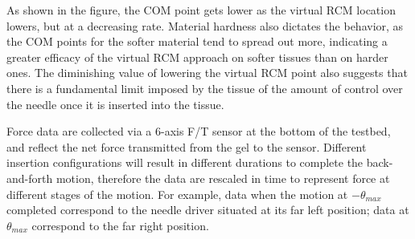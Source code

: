 \begin{table}[h]
\centering
\caption{Experimentally determined COM locations, $E_{com}$, and simulated COM locations, $S_{com}$, for the two gel materials.}
\label{tab:COM_pos_table}
\end{table}

As shown in the figure, the COM point gets lower as the virtual RCM location lowers, but at a decreasing rate. Material hardness also dictates the behavior, as the COM points for the softer material tend to spread out more, indicating a greater efficacy of the virtual RCM approach on softer tissues than on harder ones. The diminishing value of lowering the virtual RCM point also suggests that there is a fundamental limit imposed by the tissue of the amount of control  over the needle once it is inserted into the tissue.

Force data are collected via a 6-axis F/T sensor at the bottom of the testbed, and reflect the net force transmitted from the gel to the sensor. Different insertion configurations will result in different durations to complete the back-and-forth motion, therefore the data are rescaled in time to represent force at different stages of the motion. For example, data when the motion at $-\theta_{max}$ completed correspond to the needle driver situated at its far left position; data at $\theta_{max}$ correspond to the far right position.

